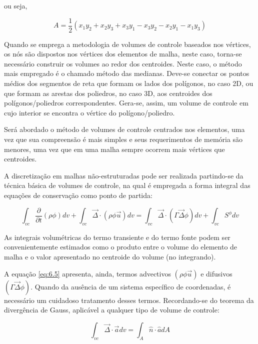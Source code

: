 ou seja,

\begin{equation}
    \label{eq:6.4}
    A = \frac{1}{2}(x_1y_2 + x_2y_3 + x_3y_1 - x_3y_2 - x_2y_1 - x_1y_3)
\end{equation}

Quando se emprega a metodologia de volumes de controle baseados nos vértices, os nós são dispostos nos vértices dos elementos de malha, neste caso, torna-se necessário construir os volumes ao redor dos centroides. Neste caso, o método mais empregado é o chamado método das medianas. Deve-se conectar os pontos médios dos segmentos de reta que formam os lados dos polígonos, no caso 2D, ou que formam as arestas dos poliedros, no caso 3D, aos centroides dos polígonos/poliedros correspondentes. Gera-se, assim, um volume de controle em cujo interior se encontra o vértice do polígono/poliedro.

Será abordado o método de volumes de controle centrados nos elementos, uma vez que sua compreensão é mais simples e seus requerimentos de memória são menores, uma vez que em uma malha sempre ocorrem mais vértices que centroides.

A discretização em malhas não-estruturadas pode ser realizada partindo-se da técnica básica de volumes de controle, na qual é empregada a forma integral das equações de conservação como ponto de partida:

\begin{equation}
    \label{eq:6.5}
    \int_{vc} \frac{\partial}{\partial t} (\rho \phi) dv + \int_{vc} \vec{\Delta} \cdot (\rho \phi \vec{u}) dv = \int_{vc} \vec{\Delta} \cdot (\Gamma \vec{\Delta} \phi) dv + \int_{vc} S^\phi dv
\end{equation}

As integrais volumétricas do termo transiente e do termo fonte podem ser convenientemente estimados como o produto entre o volume do elemento de malha e o valor apresentado no centroide do volume (no integrando).

A equação \ref{eq:6.5} apresenta, ainda, termos advectivos $(\rho \phi \vec{u})$ e difusivos $(\Gamma \vec{\Delta} \phi)$. Quando da ausência de um sistema específico de coordenadas, é necessário um cuidadoso tratamento desses termos. Recordando-se do teorema da divergência de Gauss, aplicável a qualquer tipo de volume de controle:

\begin{equation}
    \label{eq:6.6}
    \int_{vc}\vec{\Delta} \cdot \vec{a} dv = \int_A \hat{n} \cdot \hat{a} dA
\end{equation}

